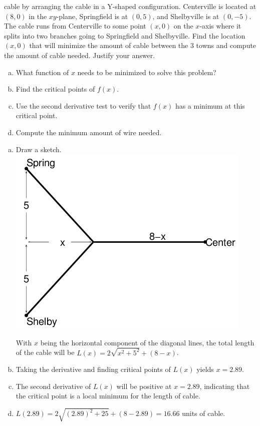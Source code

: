 \begin{enumerate}[1.]
\begin{multicols}{2}
\begin{Question}
cable by arranging the cable in a Y-shaped configuration.
Centerville is located at
\((8,0)\) in the \(xy\)-plane, Springfield is at \((0,5)\), and
Shelbyville is at \((0,- 5)\). The cable runs from Centerville
to some point \((x,0)\) on the \(x\)-axis where it splits into two branches going to
Springfield and Shelbyville. Find the location \((x,0)\)
that will minimize the amount of cable between the 3 towns and
compute the amount of cable needed. Justify your answer.
\par 
\begin{enumerate}[(a)]
\item What function of $x$ needs to be minimized to solve this problem?
\item Find the critical points of $f(x)$.
\item Use the second derivative test to verify that \(f(x)\) has a minimum at this critical point.
\item Compute the minimum amount of wire needed.
\end{enumerate}
\par\end{Question}
\begin{Solution}
  \begin{enumerate}[(a)]
\item Draw a sketch.   \\
\includegraphics[width=0.7\linewidth]{graphics/Week03_OptimizationWordProblems/Cablevision}

With $x$ being the horizontal component of the diagonal lines, the
total length of the cable will be $L(x) = 2 \sqrt{x^2+5^2}+(8 -x)$.
\item Taking the derivative and finding critical points of $L(x)$ yields $x = 2.89$.
\item The second derivative of $L(x)$ will be positive at $x = 2.89$, indicating that
the critical point is a local minimum for the length of cable. 
\item $L(2.89) = 2 \sqrt{(2.89)^2 + 25} + (8-2.89) = 16.66$ units of cable.
  \end{enumerate}


\end{Solution}
\end{multicols}
\end{enumerate}

